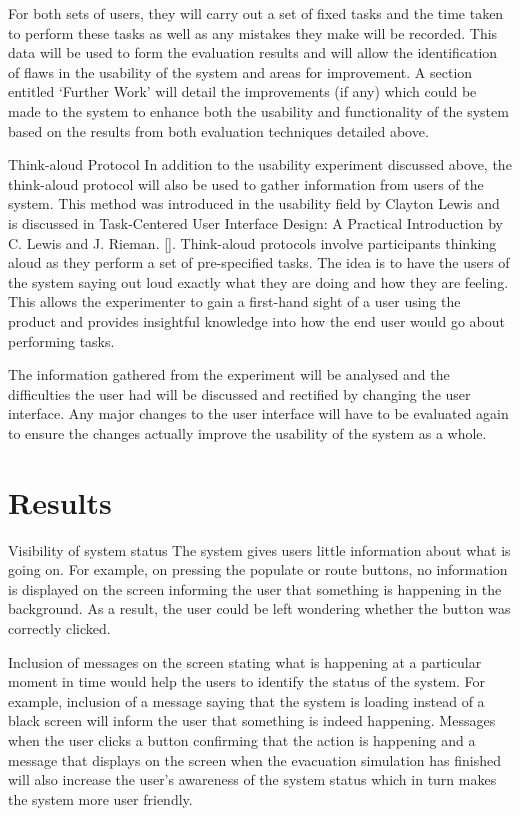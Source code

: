 \documentclass{article}
\begin{document}
For both sets of users, they will carry out a set of fixed tasks and the time taken to perform these tasks as well as any mistakes they make will be recorded. This data will be used to form the evaluation results and will allow the identification of flaws in the usability of the system and areas for improvement. A section entitled ‘Further Work’ will detail the improvements (if any) which could be made to the system to enhance both the usability and functionality of the system based on the results from both evaluation techniques detailed above.

Think-aloud Protocol
In addition to the usability experiment discussed above, the think-aloud protocol will also be used to gather information from users of the system. This method was introduced in the usability field by Clayton Lewis and is discussed in  Task-Centered User Interface Design: A Practical Introduction by C. Lewis and J. Rieman. []. Think-aloud protocols involve participants thinking aloud as they perform a set of pre-specified tasks. The idea is to have the users of the system saying out loud exactly what they are doing and how they are feeling. This allows the experimenter to gain a first-hand sight of a user using the product and provides insightful knowledge into how the end user would go about performing tasks.

The information gathered from the experiment will be analysed and the difficulties the user had will be discussed and rectified by changing the user interface. Any major changes to the user interface will have to be evaluated again to ensure the changes actually improve the usability of the system as a whole. 
\section{Results}
\label{results}

Visibility of system status
The system gives users little information about what is going on. For example, on pressing the populate or route buttons, no information is displayed on the screen informing the user that something is happening in the background. As a result, the user could be left wondering whether the button was correctly clicked.

Inclusion of messages on the screen stating what is happening at a particular moment in time would help the users to identify the status of the system. For example, inclusion of a message saying that the system is loading instead of a black screen will inform the user that something is indeed happening. Messages when the user clicks a button confirming that the action is happening and a message that displays on the screen when the evacuation simulation has finished will also increase the user’s awareness of the system status which in turn makes the system more user friendly.
\end{document}
